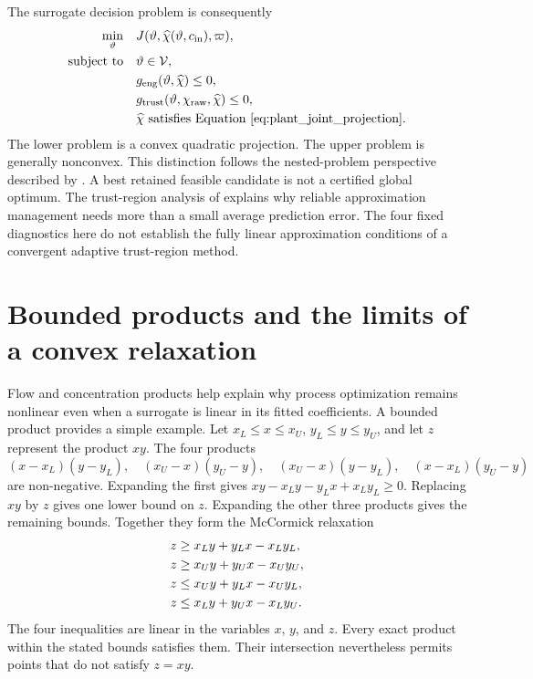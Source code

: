 The surrogate decision problem is consequently
\begin{equation}
\equationname{Surrogate-assisted plant operating optimization problem}
\begin{aligned}
\min_{\vartheta}\quad&J(\vartheta,\widehat\chi(\vartheta,c_{\rm in}),\varpi),\\
\text{subject to}\quad&\vartheta\in\mathcal V,\\
&g_{\rm eng}(\vartheta,\widehat\chi)\le0,\\
&g_{\rm trust}(\vartheta,\chi_{\rm raw},\widehat\chi)\le0,\\
&\widehat\chi\text{ satisfies Equation~\eqref{eq:plant_joint_projection}}.
\end{aligned}
\label{eq:plant_surrogate_optimization}
\end{equation}
The lower problem is a convex quadratic projection. The upper problem is generally nonconvex. This distinction follows the nested-problem perspective described by \citet{Colson2007}. A best retained feasible candidate is not a certified global optimum. The trust-region analysis of \citet{Alexandrov1998} explains why reliable approximation management needs more than a small average prediction error. The four fixed diagnostics here do not establish the fully linear approximation conditions of a convergent adaptive trust-region method.


\section{Bounded products and the limits of a convex relaxation}

Flow and concentration products help explain why process optimization remains nonlinear even when a surrogate is linear in its fitted coefficients. A bounded product provides a simple example. Let $x_L\leq x\leq x_U$, $y_L\leq y\leq y_U$, and let $z$ represent the product $xy$. The four products
\[
(x-x_L)(y-y_L),\quad (x_U-x)(y_U-y),\quad
(x_U-x)(y-y_L),\quad (x-x_L)(y_U-y)
\]
are non-negative. Expanding the first gives $xy-x_Ly-y_Lx+x_Ly_L\geq0$. Replacing $xy$ by $z$ gives one lower bound on $z$. Expanding the other three products gives the remaining bounds. Together they form the McCormick relaxation \citep{McCormick1976}
\begin{equation}
\equationname{McCormick inequalities for a bounded bilinear product}
\begin{aligned}
z&\geq x_Ly+y_Lx-x_Ly_L,\\
z&\geq x_Uy+y_Ux-x_Uy_U,\\
z&\leq x_Uy+y_Lx-x_Uy_L,\\
z&\leq x_Ly+y_Ux-x_Ly_U.
\end{aligned}
\label{eq:teaching_mccormick_relaxation}
\end{equation}
The four inequalities are linear in the variables $x$, $y$, and $z$. Every exact product within the stated bounds satisfies them. Their intersection nevertheless permits points that do not satisfy $z=xy$.

